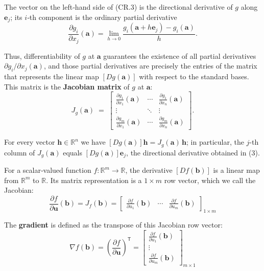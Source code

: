 \begin{notechapter}
The vector on the left‑hand side of (CR.3) is the directional derivative of $g$
along $\mathbf{e}_j$; its $i$‑th component is the ordinary partial derivative
\[
\frac{\partial g_i}{\partial x_j}(\mathbf{a}) = \lim_{h \to 0} \frac{g_i(\mathbf{a} + h\mathbf{e}_j) - g_i(\mathbf{a})}{h}.
\]

Thus, differentiability of $g$ at $\mathbf{a}$ guarantees the existence of all
partial derivatives $\partial g_i/\partial x_j(\mathbf{a})$, and those partial
derivatives are precisely the entries of the matrix that represents the linear
map $[Dg(\mathbf{a})]$ with respect to the standard bases. This matrix is the
\textbf{Jacobian matrix} of $g$ at $\mathbf{a}$:
\[
J_g(\mathbf{a}) \;=\; 
\begin{bmatrix}
\displaystyle\frac{\partial g_1}{\partial x_1}(\mathbf{a}) & \cdots & \displaystyle\frac{\partial g_1}{\partial x_n}(\mathbf{a}) \\[6pt]
\vdots & \ddots & \vdots \\[6pt]
\displaystyle\frac{\partial g_m}{\partial x_1}(\mathbf{a}) & \cdots & \displaystyle\frac{\partial g_m}{\partial x_n}(\mathbf{a})
\end{bmatrix}.
\]

For every vector $\mathbf{h}\in\mathbb{R}^n$ we have $[Dg(\mathbf{a})]\mathbf{h}
= J_g(\mathbf{a})\,\mathbf{h}$; in particular, the $j$-th column of
$J_g(\mathbf{a})$ equals $[Dg(\mathbf{a})]\mathbf{e}_j$, the directional
derivative obtained in (3).

For a scalar‑valued function $f:\mathbb{R}^m\to\mathbb{R}$, the derivative
$[Df(\mathbf{b})]$ is a linear map from $\mathbb{R}^m$ to $\mathbb{R}$. Its
matrix representation is a $1 \times m$ row vector, which we call the Jacobian:
\[
\frac{\partial f}{\partial \mathbf{u}}(\mathbf{b}) = J_f(\mathbf{b}) = \begin{bmatrix} \displaystyle\frac{\partial f}{\partial u_1}(\mathbf{b}) & \cdots & \displaystyle\frac{\partial f}{\partial u_m}(\mathbf{b}) \end{bmatrix}_{1 \times m}
\]

The \textbf{gradient} is defined as the transpose of this Jacobian row vector:
\[
\nabla f(\mathbf{b}) = \left(\frac{\partial f}{\partial \mathbf{u}}\right)^\mathsf{T} = \begin{bmatrix} \displaystyle\frac{\partial f}{\partial u_1}(\mathbf{b}) \\ \vdots \\ \displaystyle\frac{\partial f}{\partial u_m}(\mathbf{b}) \end{bmatrix}_{m \times 1}
\]


\end{notechapter}
